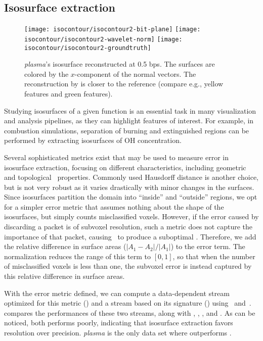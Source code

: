 \subsection{Isosurface extraction}\label{sec:isocontour}

\begin{figure}[t]
\centering
{}
{\texttt{[image: isocontour/isocontour2-bit-plane]}}
{\texttt{[image: isocontour/isocontour2-wavelet-norm]}}
{\texttt{[image: isocontour/isocontour2-groundtruth]}}
\caption{\emph{plasma}'s isosurface reconstructed at 0.5 bps. The surfaces are colored by the
$x$-component of the normal vectors. The reconstruction by \sbit is closer to the reference (compare
e.g., yellow features and green features).}
\label{fig:isocontour-surfaces-plasma}
\end{figure}


Studying isosurfaces of a given function is an essential task in many visualization and analysis
pipelines, as they can highlight features of interest. For example, in combustion simulations,
separation of burning and extinguished regions can be performed by extracting isosurfaces of OH
concentration.

Several sophisticated metrics exist that may be used to measure error in isosurface extraction,
focusing on different characteristics, including geometric~\cite{verifiable-isosurface} and
topological~\cite{topology-verification-isosurface} properties. Commonly used Hausdorff distance is
another choice, but is not very robust as it varies drastically with minor changes in the surfaces.
Since isosurfaces partition the domain into ``inside'' and ``outside'' regions, we opt for a simpler
error metric that assumes nothing about the shape of the isosurfaces, but simply counts
misclassified voxels. However, if the error caused by discarding a packet is of subvoxel resolution,
such a metric does not capture the importance of that packet, causing~ to produce a
suboptimal \siop. Therefore, we add the relative difference in surface areas ($|A_1-A_2|/|A_1|$) to
the error term. The normalization reduces the range of this term to $[0, 1]$, so that when the
number of misclassified voxels is less than one, the subvoxel error is instead captured by this
relative difference in surface areas.

With the error metric defined, we can compute a data-dependent stream optimized for this metric
(\siop) and a stream based on its signature (\sisg) using~
and~.  compares the performances of these two
streams, along with \sbit, \slvl, \swav, and \smag. As can be noticed, both \slvl performs poorly,
indicating that isosurface extraction favors resolution over precision. \emph{plasma} is the only
data set where \sbit outperforms \swav.

